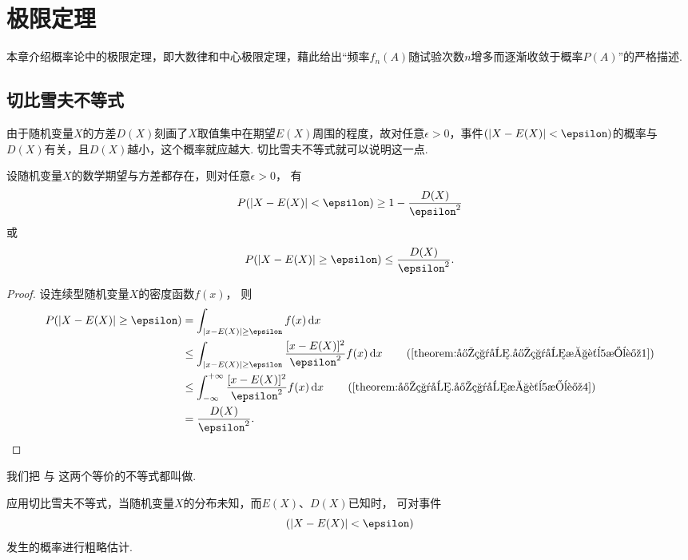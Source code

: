 \chapter{极限定理}
本章介绍概率论中的极限定理，即大数律和中心极限定理，藉此给出“频率\(f_n(A)\)随试验次数\(n\)增多而逐渐收敛于概率\(P(A)\)”的严格描述.

\section{切比雪夫不等式}
由于随机变量\(X\)的方差\(D(X)\)刻画了\(X\)取值集中在期望\(E(X)\)周围的程度，故对任意\(\epsilon>0\)，事件\((\abs{X - E(X)} < \epsilon)\)的概率与\(D(X)\)有关，且\(D(X)\)越小，这个概率就应越大.
切比雪夫不等式就可以说明这一点.

\begin{theorem}[切比雪夫不等式]\label{theorem:极限定理.切比雪夫不等式}
设随机变量\(X\)的数学期望与方差都存在，则对任意\(\epsilon > 0\)，
有\begin{equation}\label{equation:极限定理.切比雪夫不等式1}
	P(\abs{X-E(X)}<\epsilon) \geq 1 - \frac{D(X)}{\epsilon^2}
\end{equation}
或\begin{equation}\label{equation:极限定理.切比雪夫不等式2}
	P(\abs{X-E(X)}\geq\epsilon) \leq \frac{D(X)}{\epsilon^2}.
\end{equation}
\begin{proof}
设连续型随机变量\(X\)的密度函数\(f(x)\)，
则\begin{align*}
	P(\abs{X-E(X)}\geq\epsilon)
	&=\int_{\abs{x-E(X)}\geq\epsilon} f(x) \dd{x} \\
	&\leq \int_{\abs{x-E(X)}\geq\epsilon} \frac{[x - E(X)]^2}{\epsilon^2} f(x) \dd{x}
		\tag{\cref{theorem:定积分.定积分性质5推论1}} \\
	&\leq \int_{-\infty}^{+\infty} \frac{[x-E(X)]^2}{\epsilon^2} f(x) \dd{x}
		\tag{\cref{theorem:定积分.定积分性质5推论4}} \\
	&=\frac{D(X)}{\epsilon^2}.
	\qedhere
\end{align*}
\end{proof}
\end{theorem}

我们把 
与 
这两个等价的不等式都叫做.

应用切比雪夫不等式，当随机变量\(X\)的分布未知，而\(E(X)\)、\(D(X)\)已知时，
可对事件\[
(\abs{X-E(X)}<\epsilon)
\]发生的概率进行粗略估计.

